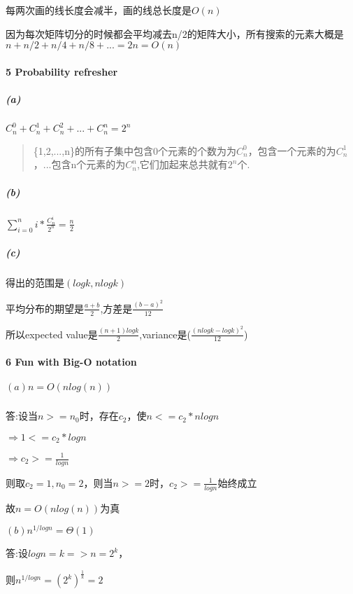 \documentclass[
]{article}
\begin{document}
每两次画的线长度会减半，画的线总长度是\(O(n)\)

因为每次矩阵切分的时候都会平均减去n/2的矩阵大小，所有搜索的元素大概是\(n+n/2+n/4+n/8+...=2n=O(n)\)

\hypertarget{header-n84}{%
\paragraph{5 Probability refresher}\label{header-n84}}

\hypertarget{header-n85}{%
\subparagraph{(a)}\label{header-n85}}

\(C_n^0+C_n^1+C_n^2+...+C_n^n = 2^n\)

\begin{quote}
\{1,2,...,n\}的所有子集中包含0个元素的个数为为\(C_n^0\)，包含一个元素的为\(C_n^1\)，...包含n个元素的为\(C_n^n\),它们加起来总共就有\(2^n\)个.
\end{quote}

\hypertarget{header-n89}{%
\subparagraph{(b)}\label{header-n89}}

\(\sum_{i=0}^{n}i*\frac{C_n^i}{2^n}=\frac{n}{2}\)

\hypertarget{header-n91}{%
\subparagraph{(c)}\label{header-n91}}

得出的范围是\((logk,nlogk)\)

平均分布的期望是\(\frac{a+b}{2}\),方差是\(\frac{(b-a)^2}{12}\)

所以expected
value是\(\frac{(n+1)logk}{2}\),variance是(\(\frac{(nlogk-logk)^2}{12}\))

\hypertarget{header-n96}{%
\paragraph{6 Fun with Big-O notation}\label{header-n96}}

\hypertarget{header-n97}{%
\subparagraph{\texorpdfstring{\((a)n=O(nlog(n))\)}{(a)n=O(nlog(n))}}\label{header-n97}}

答:设当\(n>=n_0\)时，存在\(c_2\)，使\(n<=c_2*nlogn\)

\(\Rightarrow 1<=c_2*logn\)

\(\Rightarrow c_2>=\frac{1}{logn}\)

则取\(c_2=1,n_0=2\)，则当\(n>=2\)时，\(c_2>=\frac{1}{logn}\)始终成立

故\(n=O(nlog(n))\)为真

\((b)n^{1/logn}=\Theta(1)\)

答:设\(logn=k=>n=2^k\)，

则\(n^{1/logn}=(2^{k})^{\frac{1}{k}}=2\)
\end{document}
